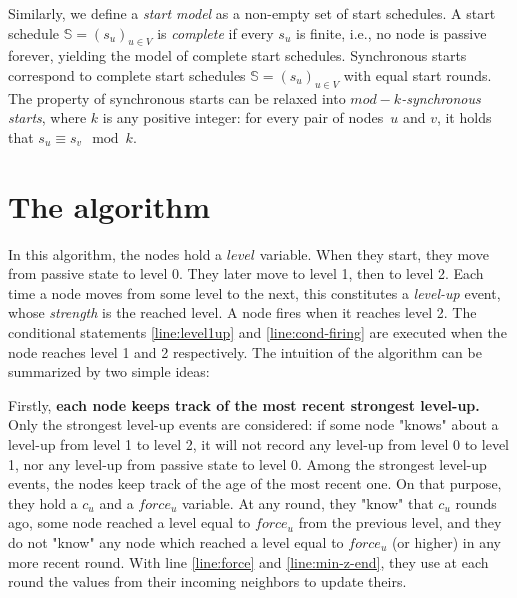 \documentclass[11pt,letterpaper]{article}
\begin{document}
Similarly, we define a \emph{start model} as a non-empty set of start schedules.
A start schedule $\mathds{S} = (s_u)_{u\in V}$ is \emph{complete} if every $s_u$ is finite, i.e.,
no node is passive forever, yielding the model of complete start schedules.
Synchronous starts correspond to complete start schedules $\mathds{S} = (s_u)_{u\in V}$ with
equal start rounds.	
The property of synchronous starts can be relaxed into \emph{$mod-k$-synchronous starts},
where $k$ is any positive integer: for every pair of nodes~$u$ and $v$, it holds that $s_u \equiv s_v \!\mod k$.

\section{The algorithm}

In this algorithm, the nodes hold a $level$ variable. When they start, they move from passive state to level 0. They later move to level 1, then to level 2.
Each time a node moves from some level to the next, this constitutes a \textit{level-up} event, whose \textit{strength} is the reached level.
A node fires when it reaches level 2.
The conditional statements \ref{line:level1up} and \ref{line:cond-firing} are executed when the node reaches level 1 and 2 respectively.
The intuition of the algorithm can be summarized by two simple ideas:

Firstly, \textbf{each node keeps track of the most recent strongest level-up.}
Only the strongest level-up events are considered: if some node "knows" about a level-up from level 1 to level 2,
it will not record any level-up from level 0 to level 1, nor any level-up from passive state to level 0.
Among the strongest level-up events, the nodes keep track of the age of the most recent one.
On that purpose, they hold a $c_u$ and a $force_u$ variable.
At any round, they "know" that $c_u$ rounds ago, some node reached a level equal to $force_u$ from the previous level,
and they do not "know" any node which reached a level equal to $force_u$ (or higher) in any more recent round.
With line \ref{line:force} and \ref{line:min-z-end}, they use at each round the values from their incoming neighbors to update theirs.
\end{document}
